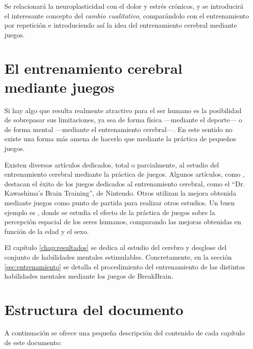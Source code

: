 Se relacionará la neuroplasticidad con el dolor y estrés crónicos, y se introducirá el interesante concepto del {\it cambio cualitativo}, comparándolo con el entrenamiento por repetición e introduciendo así la idea del entrenamiento cerebral mediante juegos.

\section{El entrenamiento cerebral mediante juegos}

Si hay algo que resulta realmente atractivo para el ser humano es la posibilidad de sobrepasar sus limitaciones, ya sea de forma física ---mediante el deporte--- o de forma mental ---mediante el entrenamiento cerebral---. En este sentido no existe una forma más amena de hacerlo que mediante la práctica de pequeños juegos.

Existen diversos artículos dedicados, total o parcialmente, al estudio del entrenamiento cerebral mediante la práctica de juegos. Algunos artículos, como \cite{Hackley2011}, destacan el éxito de los juegos dedicados al entrenamiento cerebral, como el ``Dr. Kawashima's Brain Training'', de Nintendo. Otros utilizan la mejora obtenida mediante juegos como punto de partida para realizar otros estudios. Un buen ejemplo es \cite{Hirvasoja2004}, donde se estudia el efecto de la práctica de juegos sobre la percepción espacial de los seres humanos, comparando las mejoras obtenidas en función de la edad y el sexo.

El capítulo \ref{chap:resultados} se dedica al estudio del cerebro y desglose del conjunto de habilidades mentales estimulables. Concretamente, en la sección \ref{sec:entrenamiento} se detalla el procedimiento del entrenamiento de las distintas habilidades mentales mediante los juegos de BreakBrain.

\section{Estructura del documento}

A continuación se ofrece una pequeña descripción del contenido de cada capítulo de este documento:

